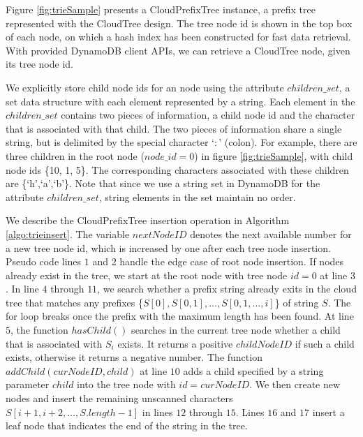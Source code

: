 \documentclass[10pt, conference, compsocconf]{IEEEtran}
\newcommand{\remove}[1]{}
\begin{document}
Figure \ref{fig:trieSample} presents a CloudPrefixTree instance, 
a prefix tree represented with the CloudTree design.
The tree node id is shown in the top box of each node,
on which a hash index has been constructed for fast data retrieval.
With provided DynamoDB client APIs,
we can retrieve a CloudTree node, given its tree node id.

We explicitly store child node ids for an node using the attribute $children\_set$, 
a set data structure with each element represented by a string.
Each element in the $children\_set$ contains two pieces of information,
 a child node id and the character
that is associated with that child. The two pieces of information share a single string, but 
is delimited by the special character `$:$' (colon).
For example, there are three children in the root node ($node\_id = 0$) in figure \ref{fig:trieSample},
with child node ids \{10, 1, 5\}. The corresponding characters associated with
these children are \{`h',`a',`b'\}.
Note that since we use a string set in DynamoDB for the attribute $children\_set$, 
string elements in the set maintain no order.

\remove{
Algorithm \ref{algo:triequery} shows the pseudo code for the CloudPrefixTree query operation.
For each character  $S_i$ in the query string, we search in the current tree node whether there exists a child that is associated with
 $S_i$. The function $hasChild()$ returns a positive $childNodeID$ for such a child if exists, otherwise returns a negative number.
 If the child does exist, that child becomes the current tree node and we repeat the previous step for the next character $S_{i+1}$.
 The $hasChild()$ function  has to retrieve the current tree node stored in the cloud via Internet. 
 }
 
We describe the CloudPrefixTree insertion operation in Algorithm \ref{algo:trieinsert}.
The variable $nextNodeID$ denotes the next available number for a new tree node id, which 
is increased by one after each tree node insertion.
Pseudo code lines $1$ and $2$ handle the edge case of root node insertion. 
If nodes already exist in the tree,
we start at the root node with tree node $id = 0$ at line $3$. In line $4$ through $11$, 
we search whether a prefix string already exits in the cloud tree that 
matches any prefixes \{$S[0], S[0, 1], \ldots, S[0,1,\ldots,i]$\} of string $S$.
The for loop breaks once the prefix with the maximum length has been found.
 At line $5$, the function $hasChild()$ searches in the current tree node whether a child that is associated with $S_i$ exists.
 It returns a positive $childNodeID$ if such a child exists, otherwise it returns a negative number.
The function $addChild(curNodeID,child)$ at line $10$ adds a child specified by a string parameter $child$ into the tree node with 
$id = curNodeID$.
We then create new nodes and insert the remaining unscanned characters $S[i+1, i+2, \ldots, S.length-1]$ 
in lines $12$ through $15$. Lines $16$ and $17$ insert a leaf node that indicates the end of the string 
in the tree.
\end{document}
